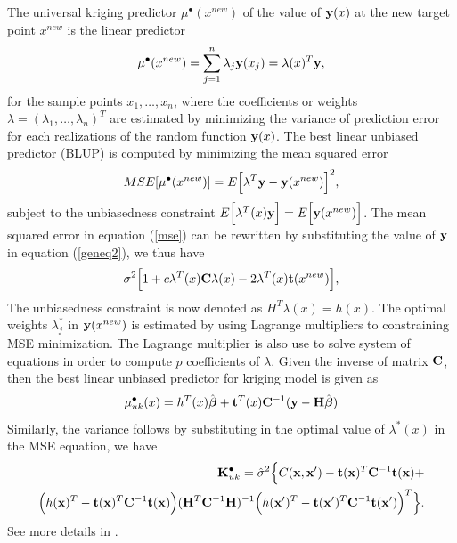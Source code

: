 The universal kriging predictor $\mu^{\bullet}(x^{new})$ of the value of ${\bf y}(x)$ at the new target point $x^{new}$ is the linear predictor
\begin{equation}
\mu^{\bullet}(x^{new})=\sum_{j=1}^n \lambda_j {\bf y} (x_j)=\lambda(x)^T{\bf y},
\end{equation}
for the sample points $x_1, \ldots , x_n$, where the coefficients or weights $\lambda=(\lambda_1, \ldots, \lambda_n)^T$ are estimated by minimizing the variance of prediction error for each realizations of the random function ${\bf y}(x)$. The best linear unbiased predictor (BLUP) is computed by minimizing the mean squared error
\begin{equation}\label{mse}
MSE[\mu^{\bullet}(x^{new})]=E\Big[\lambda^T{\bf y}-{\bf y}(x^{new})\Big]^2,
\end{equation}
subject to the unbiasedness constraint $E\Big[\lambda^T(x){\bf y}\Big] = E\Big[{\bf y}(x^{new})\Big]$. The mean squared error in equation (\ref{mse}) can be rewritten by substituting the value of ${\bf y}$ in equation (\ref{geneq2}), we thus have 
\begin{equation}
\sigma^2\Big[1 + c\lambda^T(x){\bf C}\lambda(x) - 2\lambda^T(x){\bf t}(x^{new})\Big],
\end{equation}
The unbiasedness constraint is now denoted as $H^T\lambda(x) = h(x)$. 
The optimal weights $\lambda^{*}_j$ in ${\bf y}(x^{new})$ is estimated by using Lagrange multipliers to constraining MSE minimization. The Lagrange multiplier is also use to solve system of equations in order to compute $p$ coefficients of $\lambda$.
Given the inverse of matrix ${\bf C}$, then the best linear unbiased predictor for kriging model is given as
\begin{equation}\label{man}
\mu^{\bullet}_{uk}(x) = h^T(x){\hat{\boldsymbol{\beta}}}+ {\bf t}^T(x){\bf C}^{-1}({\bf y} -{\bf H}{\hat{\boldsymbol{\beta}}})
\end{equation}
Similarly, the variance follows by substituting in the optimal value of $\lambda^*(x)$ in the MSE equation, we have
\begin{multline}\label{olu2b}%
\begin{split}
\bK^{\bullet}_{uk}=\hat \sigma^2 \Big \{C(\bx,\bx') -\bt(\bx)^T\bC^{-1} \bt(\bx) + \\ \Big ( h(\bx)^T-\bt(\bx)^T\bC^{-1}\bt(\bx) \Big )
(\bH^T\bC^{-1}\bH)^{-1}\Big (h(\bx')^T-\bt(\bx')^T\bC^{-1}\bt(\bx') \Big )^T
\Big \}.
\end{split}
\end{multline}
See more details in \citep{pd4,pd5,pd20}.

